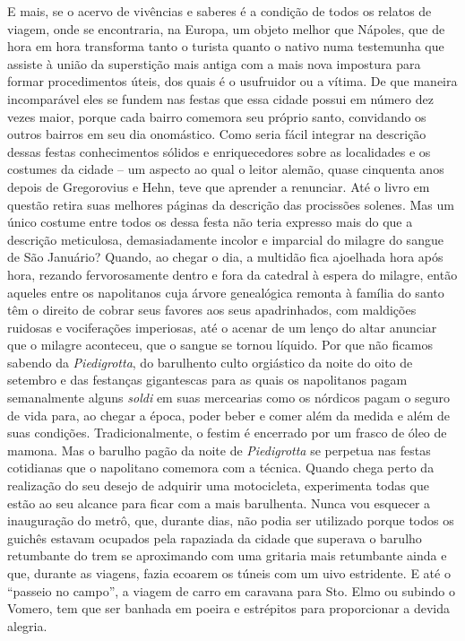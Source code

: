 E mais, se o acervo de vivências e saberes é a condição de todos os
relatos de viagem, onde se encontraria, na Europa, um objeto melhor que
Nápoles, que de hora em hora transforma tanto o turista quanto o nativo
numa testemunha que assiste à união da superstição mais antiga com a
mais nova impostura para formar procedimentos úteis, dos quais é o
usufruidor ou a vítima. De que maneira incomparável eles se fundem nas
festas que essa cidade possui em número dez vezes maior, porque cada
bairro comemora seu próprio santo, convidando os outros bairros em seu
dia onomástico. Como seria fácil integrar na descrição dessas festas
conhecimentos sólidos e enriquecedores sobre as localidades e os
costumes da cidade -- um aspecto ao qual o leitor alemão, quase
cinquenta anos depois de Gregorovius e Hehn, teve que aprender a
renunciar. Até o livro em questão retira suas melhores páginas da
descrição das procissões solenes. Mas um único costume entre todos os
dessa festa não teria expresso mais do que a descrição meticulosa,
demasiadamente incolor e imparcial do milagre do sangue de São Januário?
Quando, ao chegar o dia, a multidão fica ajoelhada hora após hora,
rezando fervorosamente dentro e fora da catedral à espera do milagre,
então aqueles entre os napolitanos cuja árvore genealógica remonta à
família do santo têm o direito de cobrar seus favores aos seus
apadrinhados, com maldições ruidosas e vociferações imperiosas, até o
acenar de um lenço do altar anunciar que o milagre aconteceu, que o
sangue se tornou líquido. Por que não ficamos sabendo da
\emph{Piedigrotta}, do barulhento culto orgiástico da noite do oito de
setembro e das festanças gigantescas para as quais os napolitanos pagam
semanalmente alguns \emph{soldi} em suas mercearias como os nórdicos
pagam o seguro de vida para, ao chegar a época, poder beber e comer além
da medida e além de suas condições. Tradicionalmente, o festim é
encerrado por um frasco de óleo de mamona. Mas o barulho pagão da noite
de \emph{Piedigrotta} se perpetua nas festas cotidianas que o napolitano
comemora com a técnica. Quando chega perto da realização do seu desejo
de adquirir uma motocicleta, experimenta todas que estão ao seu alcance
para ficar com a mais barulhenta. Nunca vou esquecer a inauguração do
metrô, que, durante dias, não podia ser utilizado porque todos os
guichês estavam ocupados pela rapaziada da cidade que superava o barulho
retumbante do trem se aproximando com uma gritaria mais retumbante ainda
e que, durante as viagens, fazia ecoarem os túneis com um uivo
estridente. E até o ``passeio no campo'', a viagem de carro em caravana
para Sto. Elmo ou subindo o Vomero, tem que ser banhada em poeira e
estrépitos para proporcionar a devida alegria.


